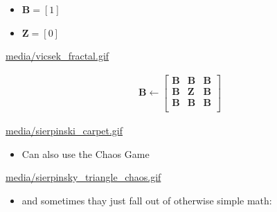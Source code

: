 \documentclass[11pt]{article}
\begin{document}
\begin{itemize}
\item \(\mathbf{B}= \left[ 1 \right]\)
\item \(\mathbf{Z}= \left[ 0 \right]\)
\end{itemize}

\url{media/vicsek\_fractal.gif}

\begin{align*}
\mathbf{B} \leftarrow
   \begin{bmatrix}
       \mathbf{B} & \mathbf{B} & \mathbf{B} \\
       \mathbf{B} & \mathbf{Z} & \mathbf{B} \\
       \mathbf{B} & \mathbf{B} & \mathbf{B} \\
   \end{bmatrix}
\end{align*}

\url{media/sierpinski\_carpet.gif}


\begin{itemize}
\item Can also use the Chaos Game
\end{itemize}

\begin{center}

\end{center}
\begin{center}

\end{center}
\begin{center}

\end{center}
\begin{center}

\end{center}
\begin{center}

\end{center}
\begin{center}

\end{center}
\begin{center}

\end{center}
\begin{center}

\end{center}
\url{media/sierpinsky\_triangle\_chaos.gif}


\begin{itemize}
\item and sometimes thay just fall out of otherwise simple math:
\end{itemize}
\end{document}
